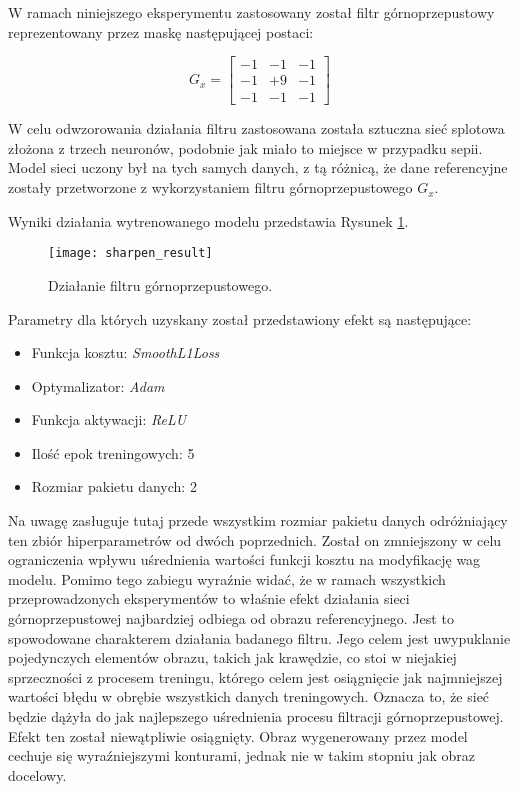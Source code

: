     W ramach niniejszego eksperymentu zastosowany został filtr górnoprzepustowy
    reprezentowany przez maskę następującej postaci:

    \[G_x =
    \begin{bmatrix}
    -1 & -1 & -1 \\
    -1 & +9 & -1 \\
    -1 & -1 & -1
    \end{bmatrix}
    \]

    W celu odwzorowania działania filtru zastosowana została sztuczna sieć
    splotowa złożona z trzech neuronów, podobnie jak miało to miejsce w przypadku
    sepii. Model sieci uczony był na tych samych danych, z tą różnicą, że dane
    referencyjne zostały przetworzone z wykorzystaniem filtru górnoprzepustowego
    $G_x$.

    Wyniki działania wytrenowanego modelu przedstawia Rysunek \ref{fig:sharpen_result}.

    \begin{figure}[h!]
      \centering
      \texttt{[image: sharpen\_result]}
      \caption[Działanie filtru górnoprzepustowego - źródło: Rysunek własny]{Działanie filtru górnoprzepustowego.}
      \label{fig:sharpen_result}
    \end{figure}

    \noindent
    Parametry dla których uzyskany został przedstawiony efekt są następujące:

    \begin{itemize}
    \item Funkcja kosztu: \textit{SmoothL1Loss}
    \item Optymalizator: \textit{Adam}
    \item Funkcja aktywacji: \textit{ReLU}
    \item Ilość epok treningowych: 5
    \item Rozmiar pakietu danych: 2
    \end{itemize}

    Na uwagę zasługuje tutaj przede wszystkim rozmiar pakietu danych odróżniający
    ten zbiór hiperparametrów od dwóch poprzednich. Został on zmniejszony w celu
    ograniczenia wpływu uśrednienia wartości funkcji kosztu na modyfikację wag
    modelu. Pomimo tego zabiegu wyraźnie widać, że w ramach wszystkich przeprowadzonych
    eksperymentów to właśnie efekt działania sieci górnoprzepustowej najbardziej
    odbiega od obrazu referencyjnego. Jest to spowodowane charakterem działania
    badanego filtru. Jego celem jest uwypuklanie pojedynczych elementów obrazu, takich
    jak krawędzie, co stoi w niejakiej sprzeczności z procesem treningu, którego celem
    jest osiągnięcie jak najmniejszej wartości błędu w obrębie wszystkich danych
    treningowych. Oznacza to, że sieć będzie dążyła do jak najlepszego uśrednienia
    procesu filtracji górnoprzepustowej. Efekt ten został niewątpliwie osiągnięty.
    Obraz wygenerowany przez model cechuje się wyraźniejszymi konturami, jednak
    nie w takim stopniu jak obraz docelowy.

